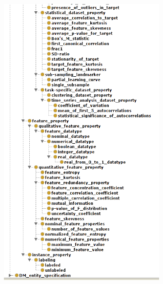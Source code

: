 \documentclass[a4paper,12pt, english]{article}
\begin{document}
\begin{figure}[h]   
  \centering 
  \includegraphics[width=0.75\textwidth]{figs/expose2-3}
  \caption{}
  \label{fig:expose2-3}
\end{figure}
\end{document}
